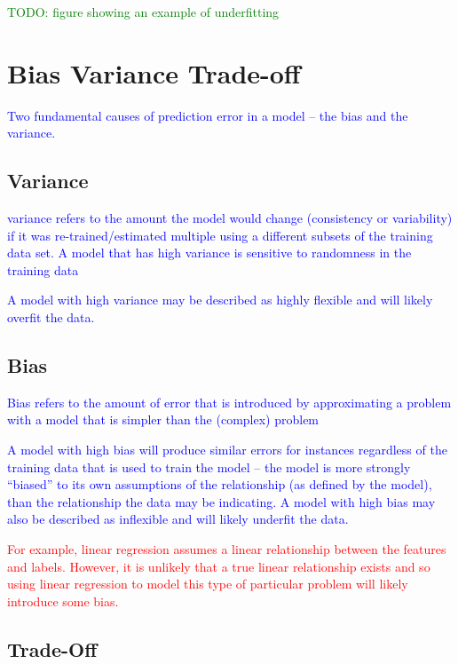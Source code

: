 \textcolor{green}{TODO: figure showing an example of underfitting}


\section{Bias Variance Trade-off}

\textcolor{blue}{Two fundamental causes of prediction error in a model -- the bias and the variance.}

\subsection{Variance}
\textcolor{blue}{variance refers to the amount the model would change (consistency or variability) if it was re-trained/estimated multiple using a different subsets of the training data set. A model that has high variance is sensitive to randomness in the training data}

\textcolor{blue}{A model with high variance may be described as highly flexible and will likely overfit the data.}


\subsection{Bias}
\textcolor{blue}{Bias refers to the amount of error that is introduced by approximating a problem with a model that is simpler than the (complex) problem}

\textcolor{blue}{A model with high bias will produce similar errors for instances regardless of the training data that is used to train the model -- the model is more strongly ``biased'' to its own assumptions of the relationship (as defined by the model), than the relationship the data may be indicating. A model with high bias may also be described as inflexible and will likely underfit the data.}


\textcolor{red}{For example, linear regression assumes a linear relationship between the features and labels. However, it is unlikely that a true linear relationship exists and so using linear regression to model this type of particular problem will likely introduce some bias.}

\subsection{Trade-Off}


